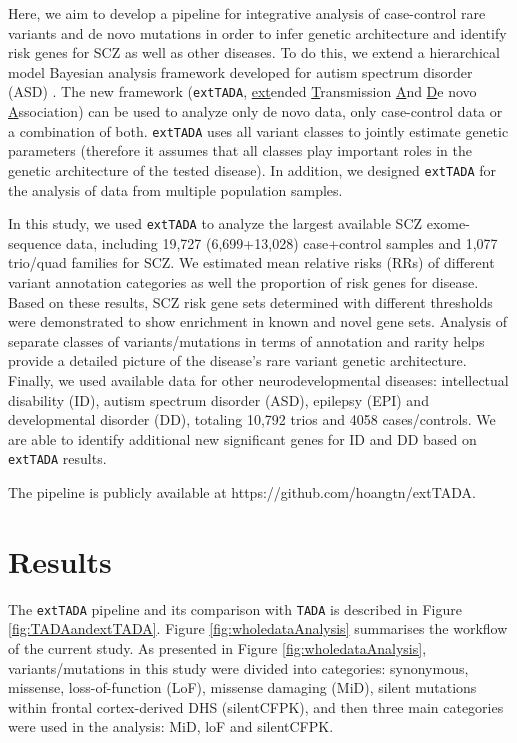 \documentclass[]{article}
\begin{document}
Here, we aim to develop a pipeline for integrative analysis of case-control rare variants and de
novo mutations in order to infer genetic architecture and identify risk genes for SCZ as well as
other diseases. To do this, we extend a hierarchical model Bayesian analysis framework developed for
autism spectrum disorder (ASD) \citep{he2013integrated}. The new framework (\texttt{extTADA},
\underline{ext}ended \underline{T}ransmission \underline{A}nd \underline{D}e novo
\underline{A}ssociation) can be used to analyze only de novo data, only case-control data or a
combination of both. \texttt{extTADA} uses all variant classes to jointly estimate genetic
parameters (therefore it assumes that all classes play important roles in the genetic architecture
of the tested disease). In
addition, we designed \texttt{extTADA} for the analysis of data from multiple population samples.

In this study, we used \texttt{extTADA} to analyze the largest available SCZ exome-sequence data,
including 19,727 (6,699+13,028) case+control samples and 1,077 trio/quad families for SCZ. We
estimated mean relative risks (RRs) of different variant annotation categories as well the
proportion of risk genes for disease. Based on these results, SCZ risk gene sets determined with
different thresholds were demonstrated to show enrichment in known and novel gene sets. Analysis of
separate classes of variants/mutations in terms of annotation and rarity helps provide a detailed
picture of the disease's rare variant genetic architecture. Finally, we used available data for
other neurodevelopmental diseases: intellectual disability (ID), autism spectrum disorder (ASD),
epilepsy (EPI) and developmental disorder (DD), totaling 10,792 trios and 4058 cases/controls. We
are able to identify additional new significant genes for ID and DD based on \texttt{extTADA}
results.

The pipeline is publicly available at https://github.com/hoangtn/extTADA.


\section{Results}

The \texttt{extTADA} pipeline and its comparison with
\texttt{TADA} is described in Figure \ref{fig:TADAandextTADA}. Figure
\ref{fig:wholedataAnalysis} summarises the workflow of the
current study. As presented in  Figure \ref{fig:wholedataAnalysis},
variants/mutations in this study were divided into categories:
synonymous, missense, loss-of-function (LoF), missense damaging (MiD), silent mutations
within frontal cortex-derived DHS (silentCFPK), and
then three main categories were used in the analysis: MiD, loF and
silentCFPK.
\end{document}
